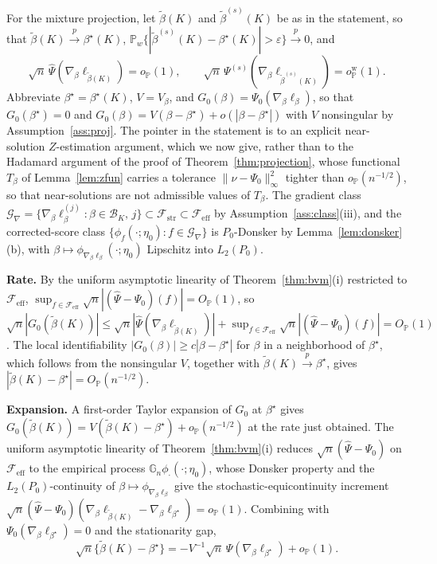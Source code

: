 \documentclass[11pt]{article}
\newcommand{\Pp}{\mathbb P}
\newcommand{\G}{\mathbb G}
\newcommand{\opro}{o_{\Pp}}
\newcommand{\Op}{O_{\Pp}}
\newcommand{\pto}{\overset{p}{\to}}
\newcommand{\calB}{\mathcal B}
\newcommand{\calF}{\mathcal F}
\newcommand{\calG}{\mathcal G}
\newcommand{\hPsi}{\widehat\Psi}
\newcommand{\eps}{\varepsilon}
\newcommand{\norm}[1]{\lVert #1\rVert}
\begin{document}
For the mixture projection, let $\tilde\beta(K)$ and $\tilde\beta^{(s)}(K)$ be as in the statement, so that $\tilde\beta(K)\pto\beta^\star(K)$, $\Pp_w\{|\tilde\beta^{(s)}(K)-\beta^\star(K)|>\eps\}\pto0$, and
\begin{equation*}
\sqrt n\,\hPsi(\nabla_\beta\ell_{\tilde\beta(K)})=\opro(1),
\qquad
\sqrt n\,\Psi^{(s)}(\nabla_\beta\ell_{\tilde\beta^{(s)}(K)})=\opro^{\mathrm w}(1).
\end{equation*}
Abbreviate $\beta^\star=\beta^\star(K)$, $V=V_\beta$, and $G_0(\beta)=\Psi_0(\nabla_\beta\ell_\beta)$, so that $G_0(\beta^\star)=0$ and $G_0(\beta)=V(\beta-\beta^\star)+o(|\beta-\beta^\star|)$ with $V$ nonsingular by Assumption~\ref{ass:proj}. The pointer in the statement is to an explicit near-solution $Z$-estimation argument, which we now give, rather than to the Hadamard argument of the proof of Theorem~\ref{thm:projection}, whose functional $T_\beta$ of Lemma~\ref{lem:zfun} carries a tolerance $\norm{\nu-\Psi_0}_\infty^2$ tighter than $\opro(n^{-1/2})$, so that near-solutions are not admissible values of $T_\beta$. The gradient class $\calG_\nabla=\{\nabla_\beta\ell_\beta^{(j)}:\beta\in\calB_K,\,j\}\subset\calF_{\mathrm{str}}\subset\calF_{\mathrm{eff}}$ by Assumption~\ref{ass:class}(iii), and the corrected-score class $\{\phi_f(\cdot;\eta_0):f\in\calG_\nabla\}$ is $P_0$-Donsker by Lemma~\ref{lem:donsker}(b), with $\beta\mapsto\phi_{\nabla_\beta\ell_\beta}(\cdot;\eta_0)$ Lipschitz into $L_2(P_0)$.

\textbf{Rate.} By the uniform asymptotic linearity of Theorem~\ref{thm:bvm}\textup{(i)} restricted to $\calF_{\mathrm{eff}}$, $\sup_{f\in\calF_{\mathrm{eff}}}\sqrt n|(\hPsi-\Psi_0)(f)|=\Op(1)$, so
$\sqrt n|G_0(\tilde\beta(K))|\le\sqrt n|\hPsi(\nabla_\beta\ell_{\tilde\beta(K)})|+\sup_{f\in\calF_{\mathrm{eff}}}\sqrt n|(\hPsi-\Psi_0)(f)|=\Op(1)$. The local identifiability $|G_0(\beta)|\ge c|\beta-\beta^\star|$ for $\beta$ in a neighborhood of $\beta^\star$, which follows from the nonsingular $V$, together with $\tilde\beta(K)\pto\beta^\star$, gives $|\tilde\beta(K)-\beta^\star|=\Op(n^{-1/2})$.

\textbf{Expansion.} A first-order Taylor expansion of $G_0$ at $\beta^\star$ gives $G_0(\tilde\beta(K))=V(\tilde\beta(K)-\beta^\star)+\opro(n^{-1/2})$ at the rate just obtained. The uniform asymptotic linearity of Theorem~\ref{thm:bvm}\textup{(i)} reduces $\sqrt n(\hPsi-\Psi_0)$ on $\calF_{\mathrm{eff}}$ to the empirical process $\G_n\phi_\cdot(\cdot;\eta_0)$, whose Donsker property and the $L_2(P_0)$-continuity of $\beta\mapsto\phi_{\nabla_\beta\ell_\beta}$ give the stochastic-equicontinuity increment $\sqrt n(\hPsi-\Psi_0)(\nabla_\beta\ell_{\tilde\beta(K)}-\nabla_\beta\ell_{\beta^\star})=\opro(1)$. Combining with $\Psi_0(\nabla_\beta\ell_{\beta^\star})=0$ and the stationarity gap,
\begin{equation*}
\sqrt n\{\tilde\beta(K)-\beta^\star\}=-V^{-1}\sqrt n\,\hPsi(\nabla_\beta\ell_{\beta^\star})+\opro(1).
\end{equation*}
\end{document}
